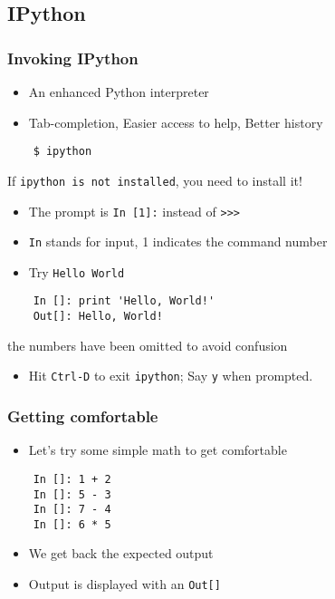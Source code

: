 \subsection*{IPython}

\begin{frame}[fragile]
  \frametitle{Invoking IPython}
  \begin{itemize}
  \item An enhanced Python interpreter 
  \item Tab-completion, Easier access to help, Better history
  \end{itemize}
  \lstset{language=sh}
  \begin{lstlisting}
    $ ipython
  \end{lstlisting} %
  \alert{If \texttt{ipython is not installed}, you need to install it!}
  \begin{itemize}
  \item The prompt is \texttt{In [1]:} instead of \verb+>>>+
  \item \texttt{In} stands for input, 1 indicates the command number
  \item Try \texttt{Hello World}
  \end{itemize}
  \begin{lstlisting}
    In []: print 'Hello, World!'
    Out[]: Hello, World!
  \end{lstlisting}
  {\tiny the numbers have been omitted to avoid confusion}
  \begin{itemize}
  \item Hit \texttt{Ctrl-D} to exit \texttt{ipython}; Say \texttt{y}
    when prompted. 
  \end{itemize}
\end{frame}

\begin{frame}[fragile]
  \frametitle{Getting comfortable}
  \begin{itemize}
  \item Let's try some simple math to get comfortable
  \end{itemize}
  \begin{lstlisting}
    In []: 1 + 2
    In []: 5 - 3
    In []: 7 - 4
    In []: 6 * 5
  \end{lstlisting}
  \begin{itemize}
  \item We get back the expected output
  \item Output is displayed with an \texttt{Out[]}
  \end{itemize}
\end{frame}

